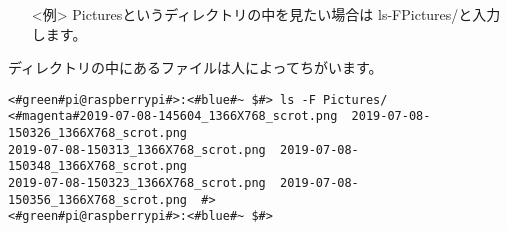 \begin{itemize}
  \item[<例>] Picturesというディレクトリの中を見たい場合は ls\textvisiblespace -F\textvisiblespace Pictures/と入力します。 
\end{itemize}

ディレクトリの中にあるファイルは人によってちがいます。
\begin{lstlisting}[caption=ls -F Pictures/コマンドの例,label=lsFPicttest]
<#green#pi@raspberrypi#>:<#blue#~ $#> ls -F Pictures/
<#magenta#2019-07-08-145604_1366X768_scrot.png  2019-07-08-150326_1366X768_scrot.png  
2019-07-08-150313_1366X768_scrot.png  2019-07-08-150348_1366X768_scrot.png  
2019-07-08-150323_1366X768_scrot.png  2019-07-08-150356_1366X768_scrot.png  #>
<#green#pi@raspberrypi#>:<#blue#~ $#> 
\end{lstlisting}

